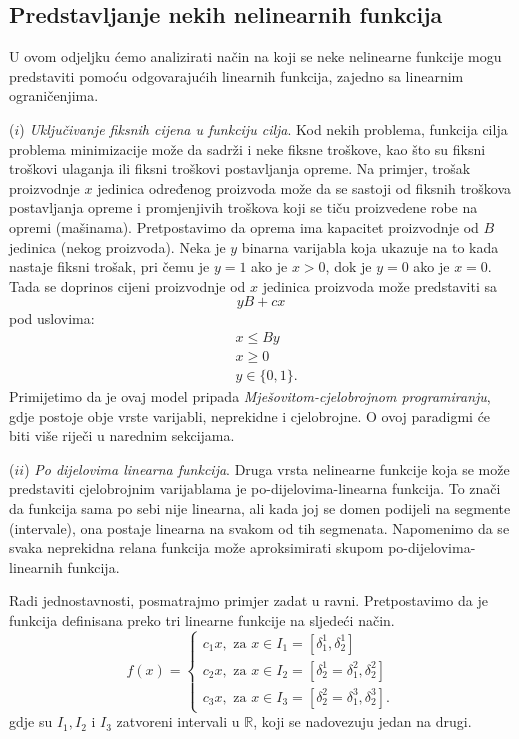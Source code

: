 \documentclass[a4paper, utf8, 11pt, colorlinks]{book}
\theoremstyle{definition}
\begin{document}

\subsection{Predstavljanje nekih nelinearnih funkcija} 

U ovom odjeljku ćemo analizirati način na koji se neke nelinearne funkcije mogu predstaviti pomoću odgovarajućih linearnih funkcija, zajedno sa linearnim ograničenjima. 

($i$) \emph{Uključivanje fiksnih cijena u funkciju cilja}. Kod nekih problema, funkcija cilja problema minimizacije može da sadrži i neke fiksne troškove, kao što su fiksni troškovi ulaganja ili fiksni troškovi postavljanja opreme. Na primjer, trošak proizvodnje $x$ jedinica određenog proizvoda može da se sastoji od fiksnih troškova postavljanja opreme i promjenjivih troškova koji se tiču proizvedene robe na opremi (mašinama). Pretpostavimo da oprema ima kapacitet proizvodnje od $B$ jedinica (nekog proizvoda). Neka je $y$ binarna varijabla koja ukazuje na to kada nastaje fiksni trošak, pri čemu  je $y=1$ ako je $x >0$, dok je $y=0$ ako je $x=0$. Tada se doprinos cijeni proizvodnje od $x$ jedinica proizvoda može predstaviti sa
$$ yB + c x $$ pod uslovima:
\begin{align}
     &x \leq By \\
     & x \geq 0 \\
     & y \in \{0, 1\}.
\end{align}
Primijetimo da je ovaj model pripada \emph{Mješovitom-cjelobrojnom programiranju}, gdje postoje obje vrste varijabli, neprekidne i cjelobrojne. O ovoj paradigmi će biti više riječi u narednim sekcijama. 

($ii$) \emph{{Po dijelovima linearna funkcija}}. Druga vrsta nelinearne funkcije koja se može predstaviti cjelobrojnim varijablama je po-dijelovima-linearna funkcija.  To znači da funkcija sama po sebi nije linearna, ali kada joj se domen podijeli na segmente (intervale), ona postaje linearna na svakom od tih segmenata. Napomenimo da se svaka neprekidna relana funkcija može aproksimirati skupom po-dijelovima-linearnih funkcija.  

Radi jednostavnosti, posmatrajmo primjer zadat u ravni. Pretpostavimo da je funkcija definisana preko tri linearne funkcije na sljedeći način.
$$f(x) = \begin{cases}
          c_1 x, \mbox{ za } x \in I_1 = [\delta^1_1, \delta^1_2] \\
          c_2 x, \mbox{ za } x \in I_2 = [\delta^1_2 = \delta^2_1, \delta^2_2] \\
          c_3 x, \mbox{ za } x \in I_3 = [\delta^2_2 = \delta^3_1, \delta^3_2].
      \end{cases}
$$
gdje su $I_1, I_2$ i $I_3$  zatvoreni intervali u $\mathbb{R}$, koji se nadovezuju jedan na drugi.
\end{document}
